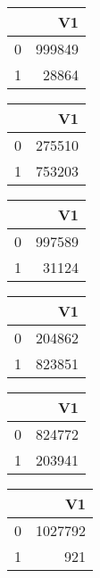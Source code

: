 \bigskip\bigskip
\centering
\begin{tabular}{rr}
  \hline
 & V1 \\ 
  \hline
0 & 999849 \\ 
  1 & 28864 \\ 
   \hline
\end{tabular}

\bigskip\bigskip
\centering
\begin{tabular}{rr}
  \hline
 & V1 \\ 
  \hline
0 & 275510 \\ 
  1 & 753203 \\ 
   \hline
\end{tabular}

\bigskip\bigskip
\centering
\begin{tabular}{rr}
  \hline
 & V1 \\ 
  \hline
0 & 997589 \\ 
  1 & 31124 \\ 
   \hline
\end{tabular}

\bigskip\bigskip
\centering
\begin{tabular}{rr}
  \hline
 & V1 \\ 
  \hline
0 & 204862 \\ 
  1 & 823851 \\ 
   \hline
\end{tabular}

\bigskip\bigskip
\centering
\begin{tabular}{rr}
  \hline
 & V1 \\ 
  \hline
0 & 824772 \\ 
  1 & 203941 \\ 
   \hline
\end{tabular}

\bigskip\bigskip
\centering
\begin{tabular}{rr}
  \hline
 & V1 \\ 
  \hline
0 & 1027792 \\ 
  1 & 921 \\ 
   \hline
\end{tabular}

